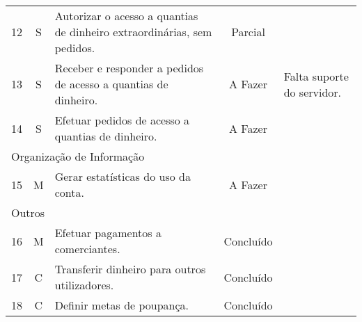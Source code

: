 \begin{center}
\begin{longtable}{@{}lcp{}cp{}@{}}
    12  & S & Autorizar o acesso a quantias de dinheiro extraordinárias, sem pedidos. & Parcial &  \\
    13  & S & Receber e responder a pedidos de acesso a quantias de dinheiro. & A Fazer & Falta suporte do servidor. \\
    14  & S & Efetuar pedidos de acesso a quantias de dinheiro. & A Fazer &  \\
    \multicolumn{5}{l}{\color{gray} Organização de Informação} \\
    15  & M & Gerar estatísticas do uso da conta. & A Fazer &  \\
    \multicolumn{5}{l}{\color{gray} Outros} \\
    16  & M & Efetuar pagamentos a comerciantes. & Concluído &  \\
    17  & C & Transferir dinheiro para outros utilizadores. & Concluído &  \\
    18  & C & Definir metas de poupança. & Concluído & 
\end{longtable}
\end{center}

